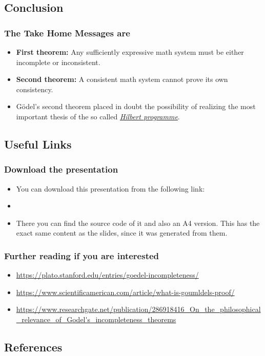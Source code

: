 \documentclass[aspectratio=169]{beamer}
\begin{document}
\subsection{Conclusion}
\begin{frame}
	\frametitle{The Take Home Messages are}
	\begin{itemize}
		\item \textbf{First theorem:} Any sufficiently expressive math system must be either incomplete or inconsistent.
		\item \textbf{Second theorem:} A consistent math system cannot prove its own consistency.
		\item Gödel's second theorem placed in doubt the possibility of realizing the most important thesis of the so called \href{https://en.wikipedia.org/wiki/Hilbert\%27s_problems}{\textit{Hilbert programme}}. \cite{bekl}
	\end{itemize}
\end{frame}

\subsection{Useful Links}

\begin{frame}
	\frametitle{Download the presentation}
	\begin{itemize}
		\item You can download this presentation from the following link:
		\item \url{}
		\item There you can find the source code of it and also an A4 version. This has the exact same content as the slides, since it was generated from them.
	\end{itemize}
\end{frame}

\begin{frame}
	\frametitle{Further reading if you are interested}
	\begin{itemize}
		\item \url{https://plato.stanford.edu/entries/goedel-incompleteness/}
		\item \url{https://www.scientificamerican.com/article/what-is-goumldels-proof/}
		\item \url{https://www.researchgate.net/publication/286918416_On_the_philosophical_relevance_of_Godel's_incompleteness_theorems}
	\end{itemize}
\end{frame}

\subsection{References}
\begin{frame}
    
    
\end{frame}
\end{document}
